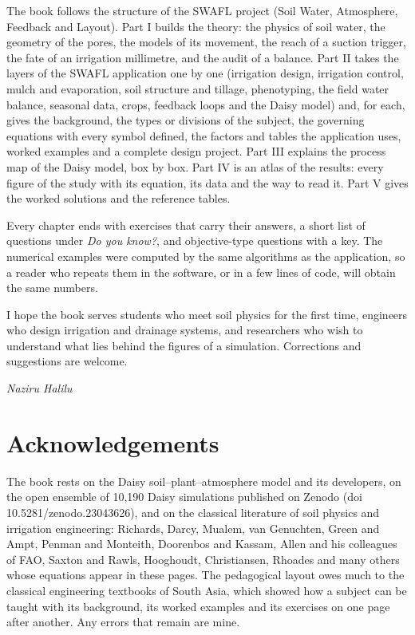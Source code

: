 The book follows the structure of the SWAFL project (Soil Water, Atmosphere, Feedback and Layout). Part I builds the theory: the physics of soil water, the geometry of the pores, the models of its movement, the reach of a suction trigger, the fate of an irrigation millimetre, and the audit of a balance. Part II takes the layers of the SWAFL application one by one (irrigation design, irrigation control, mulch and evaporation, soil structure and tillage, phenotyping, the field water balance, seasonal data, crops, feedback loops and the Daisy model) and, for each, gives the background, the types or divisions of the subject, the governing equations with every symbol defined, the factors and tables the application uses, worked examples and a complete design project. Part III explains the process map of the Daisy model, box by box. Part IV is an atlas of the results: every figure of the study with its equation, its data and the way to read it. Part V gives the worked solutions and the reference tables.

Every chapter ends with exercises that carry their answers, a short list of questions under \emph{Do you know?}, and objective-type questions with a key. The numerical examples were computed by the same algorithms as the application, so a reader who repeats them in the software, or in a few lines of code, will obtain the same numbers.

I hope the book serves students who meet soil physics for the first time, engineers who design irrigation and drainage systems, and researchers who wish to understand what lies behind the figures of a simulation. Corrections and suggestions are welcome.

\hfill\textit{Naziru Halilu}

\chapter*{Acknowledgements}
The book rests on the Daisy soil--plant--atmosphere model and its developers, on the open ensemble of 10,190 Daisy simulations published on Zenodo (doi 10.5281/zenodo.23043626), and on the classical literature of soil physics and irrigation engineering: Richards, Darcy, Mualem, van Genuchten, Green and Ampt, Penman and Monteith, Doorenbos and Kassam, Allen and his colleagues of FAO, Saxton and Rawls, Hooghoudt, Christiansen, Rhoades and many others whose equations appear in these pages. The pedagogical layout owes much to the classical engineering textbooks of South Asia, which showed how a subject can be taught with its background, its worked examples and its exercises on one page after another. Any errors that remain are mine.


